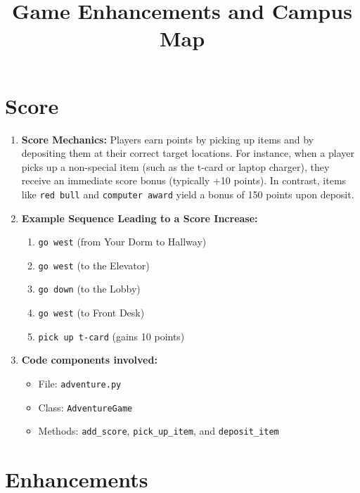 \documentclass[11pt]{article}
\begin{document}
\section*{Score}
\begin{enumerate}
    \item \textbf{Score Mechanics:}  
    Players earn points by picking up items and by depositing them at their correct target locations. For instance, when a player picks up a non-special item (such as the t-card or laptop charger), they receive an immediate score bonus (typically +10 points). In contrast, items like \texttt{red bull} and \texttt{computer award} yield a bonus of 150 points upon deposit.
    
    \item \textbf{Example Sequence Leading to a Score Increase:}
    \begin{enumerate}
         \item \texttt{go west} (from Your Dorm to Hallway)
         \item \texttt{go west} (to the Elevator)
         \item \texttt{go down} (to the Lobby)
         \item \texttt{go west} (to Front Desk)
         \item \texttt{pick up t-card} (gains 10 points)
    \end{enumerate}
    
    \item \textbf{Code components involved:}
    \begin{itemize}
         \item File: \texttt{adventure.py}
         \item Class: \texttt{AdventureGame}
         \item Methods: \texttt{add\_score}, \texttt{pick\_up\_item}, and \texttt{deposit\_item}
    \end{itemize}
\end{enumerate}



\title{Game Enhancements and Campus Map}
\author{}
\date{}



\maketitle

\section*{Enhancements}
\end{document}
